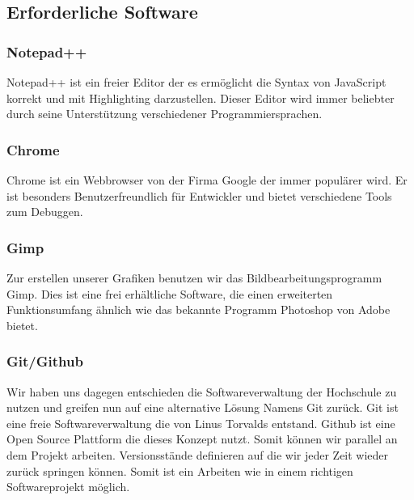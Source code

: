 \subsection{Erforderliche Software}
\subsubsection{Notepad++}
Notepad++ ist ein freier Editor der es ermöglicht die Syntax von JavaScript korrekt und mit Highlighting darzustellen. Dieser Editor wird immer beliebter durch seine Unterstützung verschiedener Programmiersprachen.
\subsubsection{Chrome}
Chrome ist ein Webbrowser von der Firma Google der immer populärer wird. Er ist besonders Benutzerfreundlich für Entwickler und bietet verschiedene Tools zum Debuggen.
\subsubsection{Gimp}
Zur erstellen unserer Grafiken benutzen wir das Bildbearbeitungsprogramm Gimp. Dies ist eine frei erhältliche Software, die einen erweiterten Funktionsumfang ähnlich wie das bekannte Programm Photoshop von Adobe bietet.
\subsubsection{Git/Github}
Wir haben uns dagegen entschieden die Softwareverwaltung der Hochschule zu nutzen und greifen nun auf eine alternative Lösung Namens Git zurück. Git ist eine freie Softwareverwaltung die von Linus Torvalds entstand. Github ist eine Open Source Plattform die dieses Konzept nutzt. Somit können wir parallel an dem Projekt arbeiten. Versionsstände definieren auf die wir jeder Zeit wieder zurück springen können. Somit ist ein Arbeiten wie in einem richtigen Softwareprojekt möglich.
